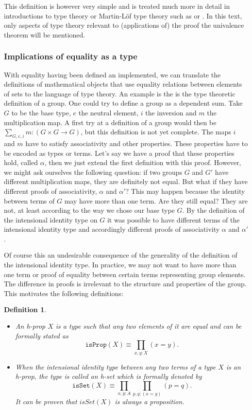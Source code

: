 \documentclass[12pt,a4paper,twoside,xetex]{book}
\newcommand{\keyword}[1]{\emph{#1}\index{#1}}
\newtheorem{definition}[theorem]{Definition}
\newcommand{\op}[1]{\mathtt{#1}}
\begin{document}
This definition is however very simple and is treated much more in detail in introductions to type theory or Martin-L\"of type theory such as \cite{Palmgren2014} or \cite{Voevodsky2013}. In this text, only aspects of type theory relevant to (applications of) the proof the univalence theorem will be mentioned.

\subsubsection{Implications of equality as a type}

With equality having been defined an implemented, we can translate the definitions of mathematical objects that use equality relations between elements of sets to the language of type theory. An example is the is the type theoretic definition of a group. One could try to define a group as a dependent sum. Take $G$ to be the base type, $e$ the neutral element, $i$ the inversion and $m$ the multiplication map. A first try at a definition of a group would then be $\sum_{G,e,i}m:(G\times G \rightarrow G)$, but this definition is not yet complete. The maps $i$ and $m$  have to satisfy associativity and other properties. These properties have to be encoded as types or terms. Let's say we have a proof that these properties hold, called $\alpha$, then we just extend the first definition with this proof. However, we might ask ourselves the following question: if two groups $G$ and $G'$ have different multiplication maps, they are definitely not equal. But what if they have different proofs of associativity, $\alpha$ and $\alpha'$? This may happen because the identity between terms of  $G$ may have more than one term. Are they still equal? They are not, at least according to the way we chose our base type $G$. By the definition of the intensional identity type on $G$ it was possible to have different terms of the intensional identity type and accordingly different proofs of associativity $\alpha$ and $\alpha'$.

Of course this an undesirable consequence of the generality of the definition of the intensional identity type. In practice, we may not want to have more than one term or proof of equality between certain terms representing group elements. The difference in proofs is irrelevant to the structure and properties of the group. This motivates the following definitions:

\begin{definition}
\begin{itemize}
\item  An \keyword{h-prop} $X$ is a type such that any two elements of it are equal and can be formally stated as $$\op{isProp}(X) \equiv \prod_{x,y:X}(x=y).$$
\item When the intensional identity type between any two terms of a type $X$ is an h-prop, the type is called an \keyword{h-set} which is formally denoted by $$\op{isSet}(X) \equiv \prod_{x,y:A}\prod_{p,q:(x=y)}(p=q).$$ It can be proven that $isSet(X)$ is always a proposition.
\end{itemize}
\end{definition}
\end{document}
